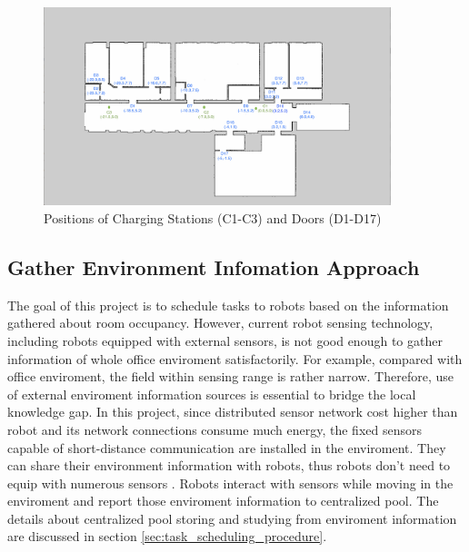 \begin{figure}[htbp]
	\centering
	\includegraphics[width = 0.9\textwidth]{content/images/ch3/positions_door_station.png}
	\caption{Positions of Charging Stations (C1-C3) and Doors (D1-D17)}
	\label{fig:positions_door_station}
\end{figure}

\subsection{Gather Environment Infomation Approach}
The goal of this project is to schedule tasks to robots based on the information gathered about room occupancy. However, current robot sensing technology, including robots equipped with external sensors, is not good enough to gather information of whole office enviroment satisfactorily. 
For example, compared with office enviroment, the field within sensing range is rather narrow. Therefore, use of external enviroment information sources is essential to bridge the local knowledge gap.
In this project, since distributed sensor network cost higher than robot and its network connections consume much energy, the fixed sensors capable of short-distance communication are installed in the enviroment. They can share their environment information with robots, thus robots don't need to equip with numerous sensors \cite{PYO2015148}.
Robots interact with sensors while moving in the enviroment and report those enviroment information to centralized pool.
The details about centralized pool storing and studying from enviroment information are discussed in section \ref{sec:task_scheduling_procedure}.


